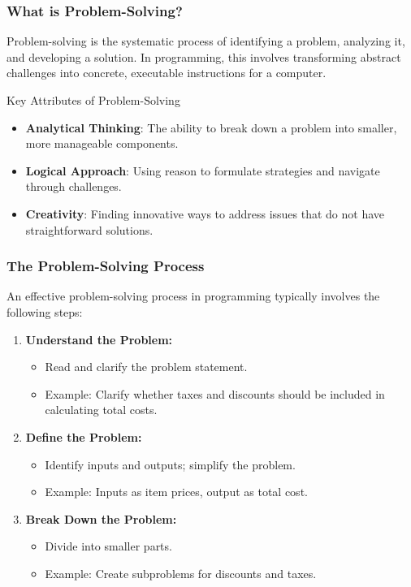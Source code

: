 \documentclass{beamer}
\begin{document}
\begin{frame}[fragile]
    \frametitle{What is Problem-Solving?}
    Problem-solving is the systematic process of identifying a problem, analyzing it, and developing a solution. In programming, this involves transforming abstract challenges into concrete, executable instructions for a computer.

    \begin{block}{Key Attributes of Problem-Solving}
        \begin{itemize}
            \item \textbf{Analytical Thinking}: The ability to break down a problem into smaller, more manageable components.
            \item \textbf{Logical Approach}: Using reason to formulate strategies and navigate through challenges.
            \item \textbf{Creativity}: Finding innovative ways to address issues that do not have straightforward solutions.
        \end{itemize}
    \end{block}
\end{frame}

\begin{frame}[fragile]
    \frametitle{The Problem-Solving Process}
    An effective problem-solving process in programming typically involves the following steps:

    \begin{enumerate}
        \item \textbf{Understand the Problem:}
            \begin{itemize}
                \item Read and clarify the problem statement.
                \item Example: Clarify whether taxes and discounts should be included in calculating total costs.
            \end{itemize}

        \item \textbf{Define the Problem:}
            \begin{itemize}
                \item Identify inputs and outputs; simplify the problem.
                \item Example: Inputs as item prices, output as total cost.
            \end{itemize}

        \item \textbf{Break Down the Problem:}
            \begin{itemize}
                \item Divide into smaller parts.
                \item Example: Create subproblems for discounts and taxes.
            \end{itemize}
    \end{enumerate}
\end{frame}
\end{document}
